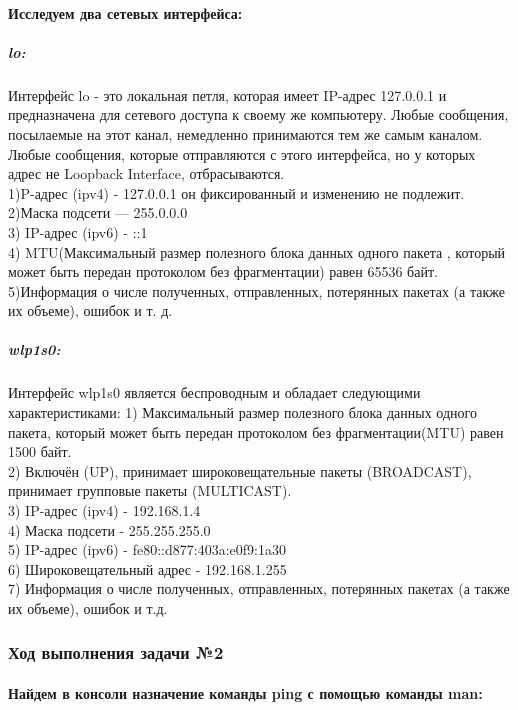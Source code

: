 \paragraph{Исследуем два сетевых интерфейса:}
\subparagraph{lo:\\}
Интерфейс lo - это локальная петля, которая имеет IP-адрес 127.0.0.1 и предназначена для сетевого доступа к своему же компьютеру. Любые сообщения, посылаемые на этот канал, немедленно принимаются тем же самым каналом. Любые сообщения, которые отправляются с этого интерфейса, но у которых адрес не Loopback Interface, отбрасываются.\\ 
1)P-адрес (ipv4) - 127.0.0.1 он фиксированный и изменению не подлежит.\\ 
2)Маска подсети — 255.0.0.0\\
3) IP-адрес (ipv6) - ::1\\
4) MTU(Максимальный размер полезного блока данных одного пакета , который может быть передан протоколом без фрагментации) равен 65536 байт.\\
5)Информация о числе полученных, отправленных, потерянных пакетах (а также 	их объеме), ошибок и т. д.
\subparagraph{wlp1s0:\\}
Интерфейс wlp1s0 является беспроводным и обладает следующими характеристиками:
1) Максимальный размер полезного блока данных одного пакета, который может быть передан протоколом без фрагментации(MTU) равен 1500 байт.\\
2) Включён (UP), принимает широковещательные пакеты (BROADCAST), принимает групповые пакеты (MULTICAST).\\
3) IP-адрес (ipv4) - 192.168.1.4\\
4) Маска подсети - 255.255.255.0\\
5) IP-адрес (ipv6) - fe80::d877:403a:e0f9:1a30\\
6) Широковещательный адрес - 192.168.1.255\\
7) Информация о числе полученных, отправленных, потерянных пакетах (а также их объеме), ошибок и т.д.

\subsubsection{Ход выполнения задачи №2}

\paragraph{Найдем в консоли назначение команды ping с помощью команды man:\\}

